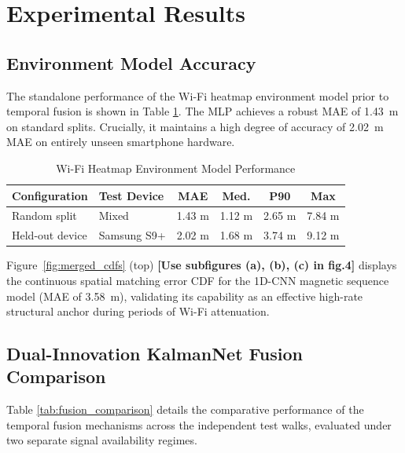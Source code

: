 \documentclass[conference]{IEEEtran}
\begin{document}
\section{Experimental Results}\label{sec:results}

\subsection{Environment Model Accuracy}

The standalone performance of the Wi-Fi heatmap environment model prior to temporal fusion is shown in Table \ref{tab:wifi_heatmap}. The MLP achieves a robust MAE of 1.43~m on standard splits. Crucially, it maintains a high degree of accuracy of 2.02~m MAE on entirely unseen smartphone hardware. 

\begin{table}[htbp]
\caption{Wi-Fi Heatmap Environment Model Performance}
\label{tab:wifi_heatmap}
\centering
\begin{tabular}{@{}llcccc@{}}
\toprule
\textbf{Configuration} & \textbf{Test Device} & \textbf{MAE} & \textbf{Med.} & \textbf{P90} & \textbf{Max} \\ \midrule
Random split & Mixed & 1.43 m & 1.12 m & 2.65 m & 7.84 m \\
Held-out device & Samsung S9+ & 2.02 m & 1.68 m & 3.74 m & 9.12 m \\ \bottomrule
\end{tabular}
\end{table}



Figure~\ref{fig:merged_cdfs} (top) \textbf{\color{red}[Use subfigures (a), (b), (c) in fig.4]} displays the continuous spatial matching error CDF for the 1D-CNN magnetic sequence model (MAE of 3.58~m), validating its capability as an effective high-rate structural anchor during periods of Wi-Fi attenuation.

\subsection{Dual-Innovation KalmanNet Fusion Comparison}

Table \ref{tab:fusion_comparison} details the comparative performance of the temporal fusion mechanisms across the independent test walks, evaluated under two separate signal availability regimes.
\end{document}
